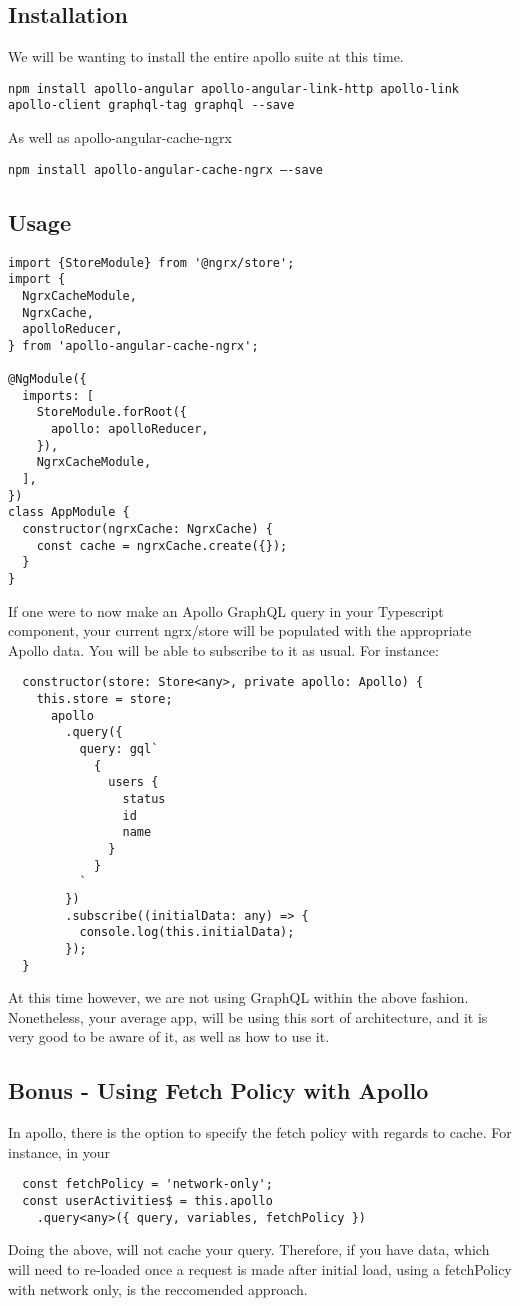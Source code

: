 \subsection{ Installation }
We will be wanting to install the entire apollo suite at this time.
\begin{lstlisting}
npm install apollo-angular apollo-angular-link-http apollo-link apollo-client graphql-tag graphql --save
\end{lstlisting}
As well as apollo-angular-cache-ngrx
\begin{lstlisting}
npm install apollo-angular-cache-ngrx —-save
\end{lstlisting}

\subsection{ Usage }
\begin{lstlisting}
import {StoreModule} from '@ngrx/store';
import {
  NgrxCacheModule,
  NgrxCache,
  apolloReducer,
} from 'apollo-angular-cache-ngrx';

@NgModule({
  imports: [
    StoreModule.forRoot({
      apollo: apolloReducer,
    }),
    NgrxCacheModule,
  ],
})
class AppModule {
  constructor(ngrxCache: NgrxCache) {
    const cache = ngrxCache.create({});
  }
}
\end{lstlisting}

If one were to now make an Apollo GraphQL query in your Typescript component,
your current ngrx/store will be populated with the appropriate Apollo data.
You will be able to subscribe to it as usual. For instance:
\begin{lstlisting}
  constructor(store: Store<any>, private apollo: Apollo) {
    this.store = store;
      apollo
        .query({
          query: gql`
            {
              users {
                status
                id
                name
              }
            }
          `
        })
        .subscribe((initialData: any) => {
          console.log(this.initialData);
        });
  }
\end{lstlisting}

At this time however, we are not using GraphQL within the above fashion.
Nonetheless, your average app, will be using this sort of architecture, and it
is very good to be aware of it, as well as how to use it.

\subsection{ Bonus - Using Fetch Policy with Apollo }
In apollo, there is the option to specify the fetch policy with regards to
cache. For instance, in your

\begin{lstlisting}
  const fetchPolicy = 'network-only';
  const userActivities$ = this.apollo
    .query<any>({ query, variables, fetchPolicy })
\end{lstlisting}

Doing the above, will not cache your query. Therefore, if you have data, which
will need to re-loaded once a request is made after initial load, using a
fetchPolicy with network only, is the reccomended approach.
